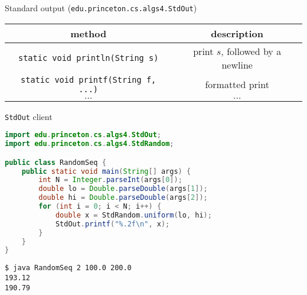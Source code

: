 \documentclass[8pt,a4paper,compress]{beamer}
\begin{document}
\begin{frame}[fragile]
Standard output (\lstinline{edu.princeton.cs.algs4.StdOut})
\begin{center}
\begin{tabular}{cc}
method & description \\ \hline
\lstinline$static void println(String s)$ & print $s$, followed by a newline \\
\lstinline$static void printf(String f, ...)$ & formatted print \\
$\dots$ & $\dots$ 
\end{tabular} 
\end{center}

\lstinline{StdOut} client
\begin{lstlisting}[language=Java]
import edu.princeton.cs.algs4.StdOut;
import edu.princeton.cs.algs4.StdRandom;

public class RandomSeq {
    public static void main(String[] args) { 
        int N = Integer.parseInt(args[0]);
        double lo = Double.parseDouble(args[1]);
        double hi = Double.parseDouble(args[2]);
        for (int i = 0; i < N; i++) {
            double x = StdRandom.uniform(lo, hi);
            StdOut.printf("%.2f\n", x);
        }
    }
}
\end{lstlisting}

\begin{lstlisting}[language={}]
$ java RandomSeq 2 100.0 200.0
193.12
190.79
\end{lstlisting}
\end{frame}
\end{document}
